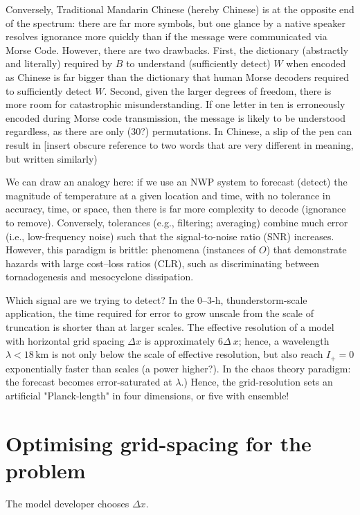 \documentclass{ametsoc}
\def\dx{$\Delta x$}
\begin{document}
Conversely, Traditional Mandarin Chinese (hereby Chinese) is at the opposite end of the spectrum: there are far more symbols, but one glance by a native speaker resolves ignorance more quickly than if the message were communicated via Morse Code. However, there are two drawbacks. First, the dictionary (abstractly and literally) required by $B$ to understand (sufficiently detect) $W$ when encoded as Chinese is far bigger than the dictionary that human Morse decoders required to sufficiently detect $W$. Second, given the larger degrees of freedom, there is more room for catastrophic misunderstanding. If one letter in ten is erroneously encoded during Morse code transmission, the message is likely to be understood regardless, as there are only (30?) permutations. In Chinese, a slip of the pen can result in [insert obscure reference to two words that are very different in meaning, but written similarly)

We can draw an analogy here: if we use an NWP system to forecast (detect) the magnitude of temperature at a given location and time, with no tolerance in accuracy, time, or space, then there is far more complexity to decode (ignorance to remove). Conversely, tolerances (e.g., filtering; averaging) combine much error (i.e., low-frequency noise) such that the signal-to-noise ratio (SNR) increases. However, this paradigm is brittle: phenomena (instances of $O$) that demonstrate hazards with large cost--loss ratios (CLR), such as discriminating between tornadogenesis and mesocyclone dissipation.

Which signal are we trying to detect? In the 0--3-h, thunderstorm-scale application, the time required for error to grow unscale from the scale of truncation is shorter than at larger scales. The effective resolution of a model with horizontal grid spacing \dx{} is approximately $6\Delta~x$; hence, a wavelength $\lambda < 18\,\textrm{km}$ is not only below the scale of effective resolution, but also reach $I_+ = 0$ exponentially faster than scales (a power higher?). In the chaos theory paradigm: the forecast becomes error-saturated at $\lambda$.) Hence, the grid-resolution sets an artificial "Planck-length" in four dimensions, or five with ensemble!



\section{Optimising grid-spacing for the problem}
The model developer chooses \dx. 
\end{document}
